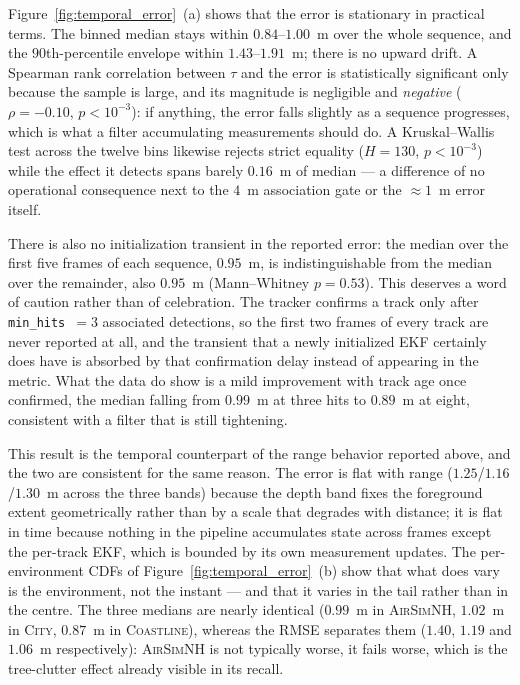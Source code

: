 Figure~\ref{fig:temporal_error}~(a) shows that the error is stationary in
practical terms. The binned median stays within $0.84$--$1.00$~m over the whole
sequence, and the $90$th-percentile envelope within $1.43$--$1.91$~m; there is no
upward drift. A Spearman rank correlation between $\tau$ and the error is
statistically significant only because the sample is large, and its magnitude is
negligible and \emph{negative} ($\rho=-0.10$, $p<10^{-3}$): if anything, the error
falls slightly as a sequence progresses, which is what a filter accumulating
measurements should do. A Kruskal--Wallis test across the twelve bins likewise
rejects strict equality ($H=130$, $p<10^{-3}$) while the effect it detects spans
barely $0.16$~m of median --- a difference of no operational consequence next to
the $4$~m association gate or the ${\approx}1$~m error itself.

There is also no initialization transient in the reported error: the median over
the first five frames of each sequence, $0.95$~m, is indistinguishable from the
median over the remainder, also $0.95$~m (Mann--Whitney $p=0.53$). This deserves a
word of caution rather than of celebration. The tracker confirms a track only
after \texttt{min\_hits}~$=3$ associated detections, so the first two frames of
every track are never reported at all, and the transient that a newly initialized
EKF certainly does have is absorbed by that confirmation delay instead of
appearing in the metric. What the data do show is a mild improvement with track
age once confirmed, the median falling from $0.99$~m at three hits to
$0.89$~m at eight, consistent with a filter that is still tightening.

This result is the temporal counterpart of the range behavior reported above, and
the two are consistent for the same reason. The error is flat with range
($1.25$/$1.16$/$1.30$~m across the three bands) because the depth band fixes the
foreground extent geometrically rather than by a scale that degrades with
distance; it is flat in time because nothing in the pipeline accumulates state
across frames except the per-track EKF, which is bounded by its own measurement
updates. The per-environment CDFs of Figure~\ref{fig:temporal_error}~(b) show that
what does vary is the environment, not the instant --- and that it varies in the
tail rather than in the centre. The three medians are nearly identical
($0.99$~m in \textsc{AirSimNH}, $1.02$~m in \textsc{City}, $0.87$~m in
\textsc{Coastline}), whereas the RMSE separates them ($1.40$, $1.19$ and
$1.06$~m respectively): \textsc{AirSimNH} is not typically worse, it fails worse,
which is the tree-clutter effect already visible in its recall.

